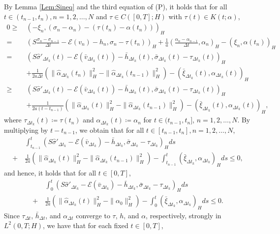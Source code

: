 \documentclass[11pt, a4paper]{article}
\newcommand{\defeq}{\coloneqq}
\newcommand{\dt}{{\Delta t}}
\newcommand{\E}{{\mathcal{E}}}
\newcommand{\Hs}{{H}}
\begin{document}
By Lemma \ref{Lem:Sineq} and the third equation of (P), it holds that for all $t \in (t_{n-1},t_n), n=1,2,\ldots,N$ and $\tau \in C([0,T];\Hs)$ with $\tau(t) \in K(t;\alpha)$,
\begin{align*}
    0 \ge~& (-\xi_n, (\sigma_n - \alpha_n) - (\tau(t_n) - \alpha(t_n)))_\Hs\\
    =~& \left(S\frac{\sigma_n - \sigma_{n-1}}{\dt} - \E(v_n) - h_n, 
    \sigma_n - \tau(t_n)\right)_\Hs
    + \frac{1}{a}\left(\frac{\alpha_n-\alpha_{n-1}}{\dt}, \alpha_n\right)_\Hs
    - (\xi_n,\alpha(t_n))_\Hs\\
    =~& \left(S\hat{\sigma}'_{\dt_k}(t) 
    - \E(\bar{v}_{\dt_k}(t)) - \bar{h}_{\dt_k}(t), 
    \bar{\sigma}_{\dt_k}(t) - \tau_{\dt_k}(t)\right)_\Hs\\
    &+ \frac{1}{2a\dt}(\|\hat{\alpha}_{\dt_k}(t_n)\|_\Hs^2 
    - \|\hat{\alpha}_{\dt_k}(t_{n-1})\|_\Hs^2)
    - (\bar{\xi}_{\dt_k}(t),\alpha_{\dt_k}(t))_\Hs\\
    \ge~& \left(S\hat{\sigma}'_{\dt_k}(t) 
    - \E(\bar{v}_{\dt_k}(t)) - \bar{h}_{\dt_k}(t), 
    \bar{\sigma}_{\dt_k}(t) - \tau_{\dt_k}(t)\right)_\Hs\\
    &+ \frac{1}{2a(t-t_{n-1})}(\|\hat{\alpha}_{\dt_k}(t)\|_\Hs^2 
    - \|\hat{\alpha}_{\dt_k}(t_{n-1})\|_\Hs^2)
    - (\bar{\xi}_{\dt_k}(t),\alpha_{\dt_k}(t))_\Hs,
\end{align*}
where $\tau_{\dt_k}(t) \defeq \tau(t_n)$ and $\alpha_{\dt_k}(t) \defeq \alpha_n$ for $t\in(t_{n-1},t_n]$, $n=1,2,\ldots,N$.
By multiplying by $t-t_{n-1}$, we obtain that for all $t\in[t_{n-1},t_n], n=1,2,\ldots,N$,
\begin{align*}
    &\int_{t_{n-1}}^{t} \left(S\hat{\sigma}'_{\dt_k} - \E(\bar{v}_{\dt_k}) - \bar{h}_{\dt_k}, 
    \bar{\sigma}_{\dt_k} - \tau_{\dt_k}\right)_\Hs ds\\
    +~& \frac{1}{2a}(\|\hat{\alpha}_{\dt_k}(t)\|_\Hs^2 
    - \|\hat{\alpha}_{\dt_k}(t_{n-1})\|_\Hs^2)
    - \int_{t_{n-1}}^{t} (\bar{\xi}_{\dt_k}, \alpha_{\dt_k})_\Hs ds
    \le 0,
\end{align*}
and hence, it holds that for all $t\in[0,T]$,
\begin{align*}
    &\int_0^t \left(S\hat{\sigma}'_{\dt_k} - \E(\bar{v}_{\dt_k}) - \bar{h}_{\dt_k}, 
    \bar{\sigma}_{\dt_k} - \tau_{\dt_k}\right)_\Hs ds\\
    +~& \frac{1}{2a}(\|\hat{\alpha}_{\dt_k}(t)\|_\Hs^2 - \|\alpha_0\|_\Hs^2)
    - \int_0^t (\bar{\xi}_{\dt_k}, \alpha_{\dt_k})_\Hs ds
    \le 0.
\end{align*}
Since $\tau_\dt$, $\bar{h}_\dt$, and $\alpha_\dt$ converge to $\tau$, $h$, and $\alpha$, respectively, strongly in $L^2(0,T;\Hs)$, we have that for each fixed $t\in[0,T]$,
\end{document}

